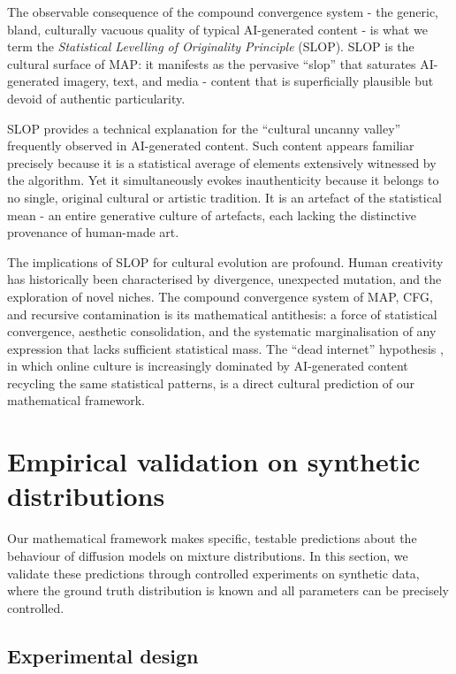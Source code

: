 \documentclass[11pt]{article}
\begin{document}
The observable consequence of the compound convergence system - the generic, bland, culturally vacuous quality of typical AI-generated content - is what we term the \textit{Statistical Levelling of Originality Principle} (SLOP). SLOP is the cultural surface of MAP: it manifests as the pervasive ``slop'' that saturates AI-generated imagery, text, and media - content that is superficially plausible but devoid of authentic particularity.

SLOP provides a technical explanation for the ``cultural uncanny valley'' frequently observed in AI-generated content. Such content appears familiar precisely because it is a statistical average of elements extensively witnessed by the algorithm. Yet it simultaneously evokes inauthenticity because it belongs to no single, original cultural or artistic tradition. It is an artefact of the statistical mean - an entire generative culture of artefacts, each lacking the distinctive provenance of human-made art.

The implications of SLOP for cultural evolution are profound. Human creativity has historically been characterised by divergence, unexpected mutation, and the exploration of novel niches. The compound convergence system of MAP, CFG, and recursive contamination is its mathematical antithesis: a force of statistical convergence, aesthetic consolidation, and the systematic marginalisation of any expression that lacks sufficient statistical mass. The ``dead internet'' hypothesis \citep{Tiffany2021}, in which online culture is increasingly dominated by AI-generated content recycling the same statistical patterns, is a direct cultural prediction of our mathematical framework.

\section{Empirical validation on synthetic distributions}\label{sec:experiments}

Our mathematical framework makes specific, testable predictions about the behaviour of diffusion models on mixture distributions. In this section, we validate these predictions through controlled experiments on synthetic data, where the ground truth distribution is known and all parameters can be precisely controlled.

\subsection{Experimental design}
\end{document}
